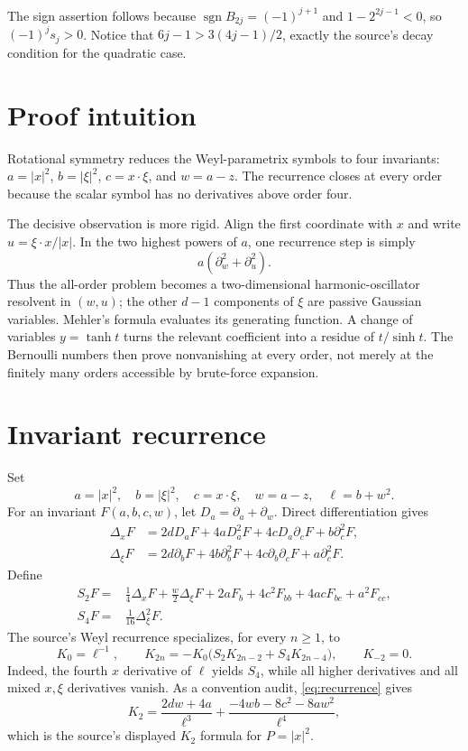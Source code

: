 \documentclass[11pt]{article}
\begin{document}
The sign assertion follows because
$\operatorname{sgn}B_{2j}=(-1)^{j+1}$ and $1-2^{2j-1}<0$, so
$(-1)^js_j>0$.  Notice that $6j-1>3(4j-1)/2$, exactly the source's decay
condition for the quadratic case.

\section{Proof intuition}
\medskip

Rotational symmetry reduces the Weyl-parametrix symbols to four invariants:
$a=|x|^2$, $b=|\xi|^2$, $c=x\cdot\xi$, and $w=a-z$.  The recurrence closes at
every order because the scalar symbol has no derivatives above order four.

The decisive observation is more rigid.  Align the first coordinate with
$x$ and write $u=\xi\cdot x/|x|$.  In the two highest powers of $a$, one
recurrence step is simply
\[
 a(\partial_w^2+\partial_u^2).
\]
Thus the all-order problem becomes a two-dimensional harmonic-oscillator
resolvent in $(w,u)$; the other $d-1$ components of $\xi$ are passive Gaussian
variables.  Mehler's formula evaluates its generating function.  A change of
variables $y=\tanh t$ turns the relevant coefficient into a residue of
$t/\sinh t$.  The Bernoulli numbers then prove nonvanishing at every order,
not merely at the finitely many orders accessible by brute-force expansion.

\section{Invariant recurrence}
\medskip

Set
\[
 a=|x|^2,\quad b=|\xi|^2,\quad c=x\cdot\xi,\quad w=a-z,
 \quad \ell=b+w^2.
\]
For an invariant $F(a,b,c,w)$, let $D_a=\partial_a+\partial_w$.  Direct
differentiation gives
\begin{align*}
 \Delta_xF&=2dD_aF+4aD_a^2F+4cD_a\partial_cF+b\partial_c^2F,\\
 \Delta_\xi F&=2d\partial_bF+4b\partial_b^2F
                 +4c\partial_b\partial_cF+a\partial_c^2F.
\end{align*}
Define
\begin{align*}
 S_2F={}&\frac14\Delta_xF+\frac w2\Delta_\xi F
     +2aF_b+4c^2F_{bb}+4acF_{bc}+a^2F_{cc},\\
 S_4F={}&\frac1{16}\Delta_\xi^2F.
\end{align*}
The source's Weyl recurrence specializes, for every $n\geq1$, to
\begin{equation}\label{eq:recurrence}
 K_0=\ell^{-1},\qquad
 K_{2n}=-K_0\bigl(S_2K_{2n-2}+S_4K_{2n-4}\bigr),
 \qquad K_{-2}=0.
\end{equation}
Indeed, the fourth $x$ derivative of $\ell$ yields $S_4$, while all higher
derivatives and all mixed $x,\xi$ derivatives vanish.  As a convention audit,
\eqref{eq:recurrence} gives
\[
K_2=\frac{2dw+4a}{\ell^3}
 +\frac{-4wb-8c^2-8aw^2}{\ell^4},
\]
which is the source's displayed $K_2$ formula for $P=|x|^2$.
\end{document}
